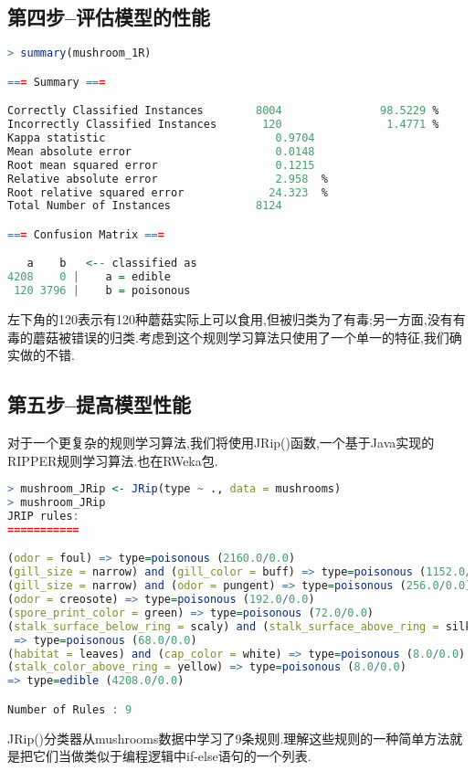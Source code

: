 \documentclass[11pt,a4paper,oneside]{book}
\begin{document}
\subsection{第四步--评估模型的性能}
\begin{lstlisting}[language=r]
> summary(mushroom_1R)

=== Summary ===

Correctly Classified Instances        8004               98.5229 %
Incorrectly Classified Instances       120                1.4771 %
Kappa statistic                          0.9704
Mean absolute error                      0.0148
Root mean squared error                  0.1215
Relative absolute error                  2.958  %
Root relative squared error             24.323  %
Total Number of Instances             8124     

=== Confusion Matrix ===

   a    b   <-- classified as
4208    0 |    a = edible
 120 3796 |    b = poisonous
\end{lstlisting}
左下角的120表示有120种蘑菇实际上可以食用,但被归类为了有毒;另一方面,没有有毒的蘑菇被错误的归类.考虑到这个规则学习算法只使用了一个单一的特征,我们确实做的不错.
\subsection{第五步--提高模型性能}
对于一个更复杂的规则学习算法,我们将使用JRip()函数,一个基于Java实现的RIPPER规则学习算法.也在RWeka包.
\begin{lstlisting}[language=r]
> mushroom_JRip <- JRip(type ~ ., data = mushrooms)
> mushroom_JRip
JRIP rules:
===========

(odor = foul) => type=poisonous (2160.0/0.0)
(gill_size = narrow) and (gill_color = buff) => type=poisonous (1152.0/0.0)
(gill_size = narrow) and (odor = pungent) => type=poisonous (256.0/0.0)
(odor = creosote) => type=poisonous (192.0/0.0)
(spore_print_color = green) => type=poisonous (72.0/0.0)
(stalk_surface_below_ring = scaly) and (stalk_surface_above_ring = silky)
 => type=poisonous (68.0/0.0)
(habitat = leaves) and (cap_color = white) => type=poisonous (8.0/0.0)
(stalk_color_above_ring = yellow) => type=poisonous (8.0/0.0)
=> type=edible (4208.0/0.0)

Number of Rules : 9
\end{lstlisting}

JRip()分类器从mushrooms数据中学习了9条规则.理解这些规则的一种简单方法就是把它们当做类似于编程逻辑中if-else语句的一个列表.
\end{document}
